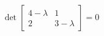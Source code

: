 \documentclass{article}
\begin{document}
\begin{align*}
\det \begin{bmatrix} 4-\lambda & 1 \\ 2 & 3-\lambda \end{bmatrix} = 0
\end{align*}
\end{document}
